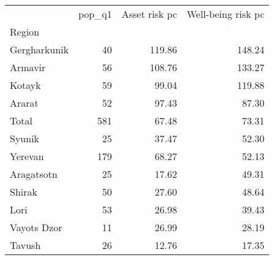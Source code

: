 \begin{tabular}{lrrr}
\toprule
{} &  pop\_q1 &  Asset risk pc &  Well-being risk pc \\
Region       &         &                &                     \\
\midrule
Gergharkunik &      40 &         119.86 &              148.24 \\
Armavir      &      56 &         108.76 &              133.27 \\
Kotayk       &      59 &          99.04 &              119.88 \\
Ararat       &      52 &          97.43 &               87.30 \\
Total        &     581 &          67.48 &               73.31 \\
Syunik       &      25 &          37.47 &               52.30 \\
Yerevan      &     179 &          68.27 &               52.13 \\
Aragatsotn   &      25 &          17.62 &               49.31 \\
Shirak       &      50 &          27.60 &               48.64 \\
Lori         &      53 &          26.98 &               39.43 \\
Vayots Dzor  &      11 &          26.99 &               28.19 \\
Tavush       &      26 &          12.76 &               17.35 \\
\bottomrule
\end{tabular}
